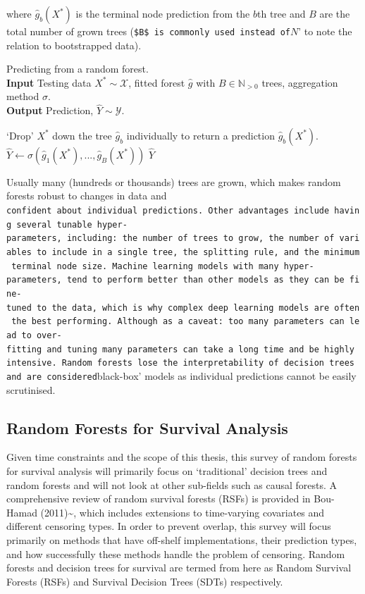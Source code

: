 \documentclass[
  letterpaper,
]{scrbook}
\theoremstyle{plain}
\theoremstyle{definition}
\theoremstyle{remark}
\begin{document}
where \(\hat{g}_b(X^*)\) is the terminal node prediction from the
\(b\)th tree and \(B\) are the total number of grown trees
(\texttt{\$B\$\textquotesingle{}\ is\ commonly\ used\ instead\ of}\(N\)'
to note the relation to bootstrapped data).

\begin{algorithm}
\caption{Predicting from a random forest. \\
\textbf{Input} Testing data $X^* \sim \mathcal{X}$, fitted forest $\hat{g}$ with $B \in \mathbb{N}_{> 0}$ trees, aggregation method $\sigma$. \\
\textbf{Output} Prediction, $\hat{Y}\sim \mathcal{Y}$.}\label{alg:rsf_pred}
\begin{algorithmic}[1]
\State `Drop' $X^*$ down the tree $\hat{g}_b$ individually to return a prediction $\hat{g}_b(X^*)$.
\EndFor
\State $\hat{Y}\gets \sigma(\hat{g}_1(X^*),...,\hat{g}_B(X^*))$
\Return $\hat{Y}$
\end{algorithmic}
\end{algorithm}

Usually many (hundreds or thousands) trees are grown, which makes random
forests robust to changes in data and
\texttt{confident\textquotesingle{}\ about\ individual\ predictions.\ Other\ advantages\ include\ having\ several\ tunable\ hyper-parameters,\ including:\ the\ number\ of\ trees\ to\ grow,\ the\ number\ of\ variables\ to\ include\ in\ a\ single\ tree,\ the\ splitting\ rule,\ and\ the\ minimum\ terminal\ node\ size.\ Machine\ learning\ models\ with\ many\ hyper-parameters,\ tend\ to\ perform\ better\ than\ other\ models\ as\ they\ can\ be\ fine-tuned\ to\ the\ data,\ which\ is\ why\ complex\ deep\ learning\ models\ are\ often\ the\ best\ performing.\ Although\ as\ a\ caveat:\ too\ many\ parameters\ can\ lead\ to\ over-fitting\ and\ tuning\ many\ parameters\ can\ take\ a\ long\ time\ and\ be\ highly\ intensive.\ Random\ forests\ lose\ the\ interpretability\ of\ decision\ trees\ and\ are\ considered}black-box'
models as individual predictions cannot be easily scrutinised.

\subsection{Random Forests for Survival Analysis}

Given time constraints and the scope of this thesis, this survey of
random forests for survival analysis will primarily focus on
`traditional' decision trees and random forests and will not look at
other sub-fields such as causal forests. A comprehensive review of
random survival forests (RSFs) is provided in Bou-Hamad
(2011)\textasciitilde{}\cite{Bou-Hamad2011}, which includes extensions
to time-varying covariates and different censoring types. In order to
prevent overlap, this survey will focus primarily on methods that have
off-shelf implementations, their prediction types, and how successfully
these methods handle the problem of censoring. Random forests and
decision trees for survival are termed from here as Random Survival
Forests (RSFs) and Survival Decision Trees (SDTs) respectively.
\end{document}
